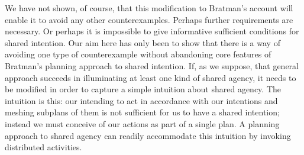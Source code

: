 \documentclass[12pt,\papersize]{extarticle}
\begin{document}
We have not shown, of course, that this modification to Bratman's account will enable it to avoid any other counterexamples.
Perhaps further requirements are necessary.
Or perhaps it is impossible to give informative sufficient conditions for shared intention.
Our aim here has only been to show that there is a way of avoiding one type of counterexample without abandoning core features of Bratman's planning approach to shared intention.
If, as we suppose, that general approach succeeds in illuminating at least one kind of shared agency, it needs to be modified in order to capture a simple intuition about shared agency.
The intuition is this:
	our intending to act in accordance with our intentions and meshing subplans of them is not sufficient for us to have a shared intention;
	instead we must conceive of our actions as part of a single plan.
A planning approach to shared agency can readily accommodate this intuition by invoking distributed activities.

%
%
%
%
%
%	
\end{document}
